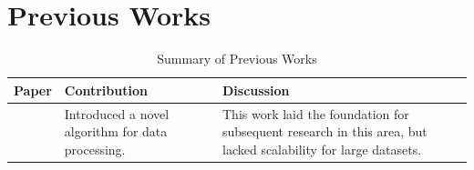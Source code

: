 \chapter{Previous Works}
\label{chap:previous_works}

\begin{table}[h!]
    \centering
    \begin{tabular}{|p{5cm}|p{5cm}|p{5cm}|}
        \hline
        \textbf{Paper} & \textbf{Contribution} & \textbf{Discussion} \\
        \hline
        \cite{Prakash_2025_ICCV} & Introduced a novel algorithm for data processing. & This work laid the foundation for subsequent research in this area, but lacked scalability for large datasets. \\
        \hline
    \end{tabular}
    \caption{Summary of Previous Works}
    \label{tab:previous_works}
\end{table}